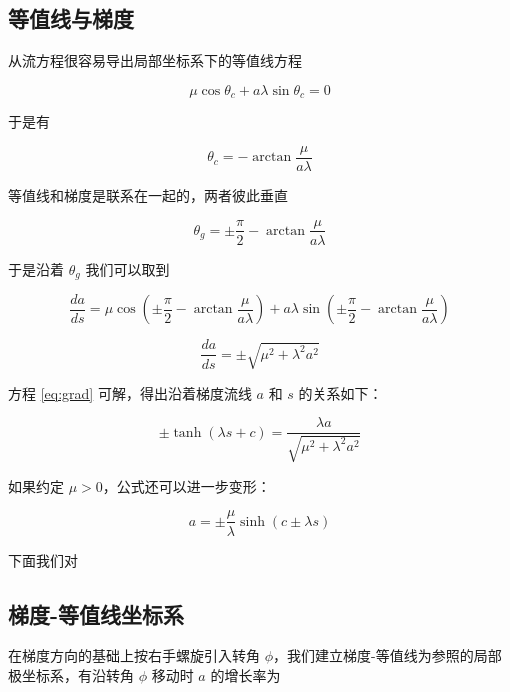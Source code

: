 \documentclass[a4paper,12pt]{article}
\numberwithin{definition}{section}
\numberwithin{lemma}{section}
\numberwithin{proposition}{section}
\numberwithin{theorem}{section}
\numberwithin{grammar}{section}
\numberwithin{program}{section}
\numberwithin{convention}{section}
\numberwithin{corollary}{section}
\begin{document}
\subsection{等值线与梯度}

从流方程很容易导出局部坐标系下的等值线方程

\begin{equation}
    \mu \cos \theta_c + a \lambda \sin \theta_c = 0
\end{equation}

于是有

\begin{equation}
    \theta_c = - \arctan \frac{\mu}{a \lambda}
\end{equation}

等值线和梯度是联系在一起的，两者彼此垂直

\begin{equation}
    \theta_g = \pm \frac{\pi}{2} - \arctan \frac{\mu}{a \lambda}
\end{equation}

于是沿着 $\theta_g$ 我们可以取到

\begin{equation}
    \frac{da}{ds} = \mu \cos (\pm \frac{\pi}{2} - \arctan \frac{\mu}{a \lambda}) + a \lambda \sin (\pm \frac{\pi}{2} - \arctan \frac{\mu}{a \lambda})
\end{equation}

\begin{equation}
    \frac{da}{ds} = \pm \sqrt{\mu^2 + \lambda^2 a^2}\label{eq:grad}
\end{equation}

方程 \eqref{eq:grad} 可解，得出沿着梯度流线 $a$ 和 $s$ 的关系如下：

\begin{equation}
    \pm \tanh(\lambda s + c) = \frac{\lambda a}{\sqrt{\mu^2 + \lambda^2 a^2}}
\end{equation}

如果约定 $\mu > 0$，公式还可以进一步变形：

\begin{equation}
  a = \pm \frac{\mu}{\lambda} \sinh(c \pm \lambda s)
\end{equation}

下面我们对

\subsection{梯度-等值线坐标系}

在梯度方向的基础上按右手螺旋引入转角 $\phi$，我们建立梯度-等值线为参照的局部极坐标系，有沿转角 $\phi$ 移动时 $a$ 的增长率为
\end{document}
